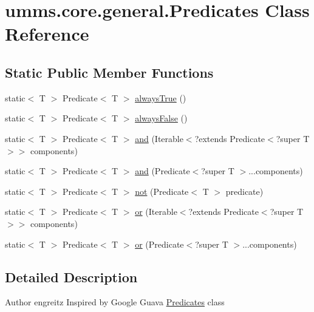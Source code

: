 \hypertarget{classumms_1_1core_1_1general_1_1_predicates}{\section{umms.\+core.\+general.\+Predicates Class Reference}
\label{classumms_1_1core_1_1general_1_1_predicates}
}
\subsection*{Static Public Member Functions}
\begin{DoxyCompactItemize}
\item 
static$<$ T $>$ Predicate$<$ T $>$ \hyperlink{classumms_1_1core_1_1general_1_1_predicates_a091ca0c838768ce940f853b02c21caa6}{always\+True} ()
\item 
static$<$ T $>$ Predicate$<$ T $>$ \hyperlink{classumms_1_1core_1_1general_1_1_predicates_ae5394589a9dfe455ee5b00597a0cc97b}{always\+False} ()
\item 
static$<$ T $>$ Predicate$<$ T $>$ \hyperlink{classumms_1_1core_1_1general_1_1_predicates_a17c99470d5b64228a434369ae35bbc2a}{and} (Iterable$<$?extends Predicate$<$?super T $>$$>$ components)
\item 
static$<$ T $>$ Predicate$<$ T $>$ \hyperlink{classumms_1_1core_1_1general_1_1_predicates_acc149cc283d7e594245c25a1bb70540e}{and} (Predicate$<$?super T $>$...components)
\item 
static$<$ T $>$ Predicate$<$ T $>$ \hyperlink{classumms_1_1core_1_1general_1_1_predicates_aecc8e245a29d3b5475321d130ad5dbe1}{not} (Predicate$<$ T $>$ predicate)
\item 
static$<$ T $>$ Predicate$<$ T $>$ \hyperlink{classumms_1_1core_1_1general_1_1_predicates_a9ac8906f39cbf25605bbc31aef6f89db}{or} (Iterable$<$?extends Predicate$<$?super T $>$$>$ components)
\item 
static$<$ T $>$ Predicate$<$ T $>$ \hyperlink{classumms_1_1core_1_1general_1_1_predicates_a478f15f195730aa80764f1064450b4f3}{or} (Predicate$<$?super T $>$...components)
\end{DoxyCompactItemize}


\subsection{Detailed Description}
\begin{DoxyAuthor}{Author}
engreitz Inspired by Google Guava \hyperlink{classumms_1_1core_1_1general_1_1_predicates}{Predicates} class 
\end{DoxyAuthor}


